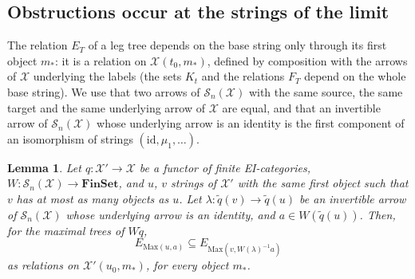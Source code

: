 \documentclass[11pt]{amsart}
\newtheorem{lem}[thm]{Lemma}
\theoremstyle{definition}
\newcommand{\Fin}{\mathbf{FinSet}}
\newcommand{\Max}{\mathrm{Max}}
\newcommand{\cX}{\mathcal X}
\newcommand{\cS}{\mathcal S}
\newcommand{\id}{\mathrm{id}}
\begin{document}
\subsection*{Obstructions occur at the strings of the limit}
The relation $E_T$ of a leg tree depends on the base string only
through its first object $m_*$: it is a relation on $\cX(t_0,m_*)$,
defined by composition with the arrows of $\cX$ underlying the labels
(the sets $K_t$ and the relations $F_T$ depend on the whole base
string). We use that two arrows of $\cS_n(\cX)$ with the same source,
the same target and the same underlying arrow of $\cX$ are equal, and
that an invertible arrow of $\cS_n(\cX)$ whose underlying arrow is an
identity is the first component of an isomorphism of strings
$(\id,\mu_1,\dots)$.

\begin{lem}\label{lem:first}
Let $q\colon\cX'\to\cX$ be a functor of finite EI-categories,
$W\colon\cS_n(\cX)\to\Fin$, and $u$, $v$ strings of $\cX'$ with the
same first object such that $v$ has at most as many objects as $u$.
Let $\lambda\colon\tilde q(v)\to\tilde q(u)$ be an invertible arrow of
$\cS_n(\cX)$ whose underlying arrow is an identity, and $a\in W(\tilde
q(u))$. Then, for the maximal trees of $W\tilde q$,
\[
E_{\Max(u,a)}\subseteq E_{\Max(v,W(\lambda)^{-1}a)}
\]
as relations on $\cX'(u_0,m_*)$, for every object $m_*$.
\end{lem}
\end{document}
